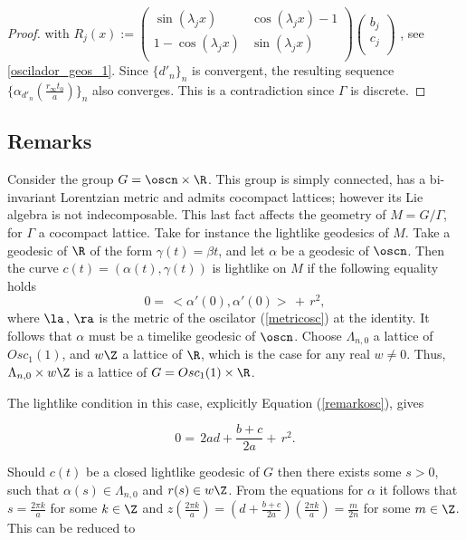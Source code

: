 \documentclass[11pt]{amsart}
\theoremstyle{plain}
\theoremstyle{definition}
\theoremstyle{remark}
\begin{document}
\begin{proof}
			with $R_j(x) := \left( \begin{matrix}
				\sin{(\lambda_j x)} & \cos{(\lambda_j x)} -1 \\
				1 - \cos{(\lambda_j x)} & \sin{(\lambda_j x)} \\
			\end{matrix} \right)
			\left( \begin{matrix}
				b_j \\
				c_j \\
			\end{matrix} \right)$ , see \eqref{oscilador_geos_1}. Since $\{d'_n\}_n$ is convergent, the resulting sequence $\{ \alpha_{d'_n}(\frac{r_{\infty} t_0}{a}) \}_n$ also converges. This is a contradiction since $\Gamma$ is discrete.
			
		\end{proof}
		
		
		
	
	\subsection{Remarks}
	Consider the group $G=\oscn \times \R$. This group is simply connected, has a bi-invariant Lorentzian metric and admits cocompact lattices; however its Lie algebra is not indecomposable. This last fact affects the geometry of $M=G/\Gamma$, for $\Gamma$ a cocompact lattice. Take for instance the lightlike geodesics of $M$. Take a geodesic of $\R$ of the form $\gamma(t)=\beta t$, and let $\alpha$ be a geodesic of $\oscn$. Then the curve  $c(t)=(\alpha(t),\gamma(t))$ is lightlike on $M$ if the following equality holds
	\begin{equation}\label{remarkosc}
		0 = \, <\alpha'(0),\alpha'(0)> \, + \, r^2, 
	\end{equation}
	where $\la \,,\,\ra$ is the metric of the oscilator (\ref{metricosc}) at the identity. It follows that $\alpha$ must be a timelike geodesic of $\oscn$. Choose $\Lambda_{n,0}$  a lattice of $Osc_1(1)$, and $w \Z$ a lattice of $\R$, which is the case for any real $w \neq 0$. Thus,  $\Lambda_{n,0} \times w \Z$ is a lattice of $G=Osc_1(1) \times \R$.
	
	The lightlike condition in this case, explicitly Equation (\ref{remarkosc}), gives
	
	\begin{equation*}
		0 = \, 2 a d + \frac{b+c}{2a} + \, r^2. 
	\end{equation*}
	
	Should $c(t)$ be a closed lightlike geodesic of $G$ then there exists some  $s>0$, such that $\alpha(s) \in \Lambda_{n,0}$ and $r(s) \in w \Z$. From the equations for  $\alpha$ it follows that $s=\frac{2 \pi k}{a}$ for some $k \in \Z$ and $z(\frac{2 \pi k}{a})=(d+\frac{b+c}{2 a})(\frac{2 \pi k}{a})=\frac{m}{2n}$ for some $m \in \Z$. This can be reduced to 
	
\end{document}
